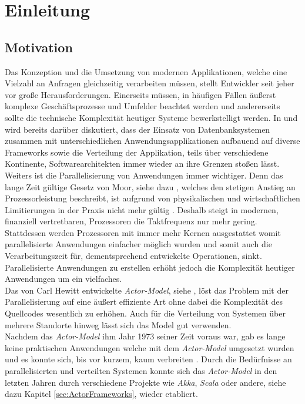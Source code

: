 \chapter{Einleitung}\label{cha:introduction}
\section{Motivation}\label{sec:introduction:motivation}
Das Konzeption und die Umsetzung von modernen Applikationen, welche eine Vielzahl an Anfragen gleichzeitig verarbeiten müssen, stellt Entwickler seit jeher vor große Herausforderungen. Einerseits müssen, in häufigen Fällen äußerst komplexe Geschäftsprozesse und Umfelder beachtet werden und andererseits sollte die technische Komplexität heutiger Systeme bewerkstelligt werden. In \cite{Vernon2015ReactiveAkka} und \cite{Evans2004Domain-drivenSoftware} wird bereits darüber diskutiert, dass der Einsatz von Datenbanksystemen zusammen mit unterschiedlichen Anwendungsapplikationen aufbauend auf diverse Frameworks  sowie die Verteilung der Applikation, teils über verschiedene Kontinente,  Softwarearchitekten immer wieder an ihre Grenzen stoßen lässt. \\
Weiters ist die Parallelisierung von Anwendungen immer wichtiger. Denn das lange Zeit gültige Gesetz von Moor, siehe dazu \cite{moore1965moore}, welches den stetigen Anstieg an Prozessorleistung beschreibt, ist aufgrund von physikalischen und wirtschaftlichen Limitierungen in der Praxis nicht mehr gültig \citep{mann2000end}. Deshalb steigt in modernen, finanziell vertretbaren, Prozessoren die Taktfrequenz nur mehr gering. Stattdessen werden Prozessoren mit immer mehr Kernen ausgestattet womit parallelisierte Anwendungen einfacher möglich wurden und somit auch die Verarbeitungszeit für, dementsprechend entwickelte Operationen, sinkt. Parallelisierte Anwendungen zu erstellen erhöht jedoch die Komplexität heutiger Anwendungen um ein vielfaches. \\
Das von Carl Hewitt entwickelte \textit{Actor-Model}, siehe \cite{Hewitt1973AIntelligence}, löst das Problem mit der Parallelisierung auf eine äußert effiziente Art ohne dabei die Komplexität des Quellcodes wesentlich zu erhöhen. Auch für die Verteilung von Systemen über mehrere Standorte hinweg lässt sich das Model gut verwenden. \\
Nachdem das \textit{Actor-Model} ihm Jahr 1973 seiner Zeit voraus war, gab es lange keine praktischen Anwendungen welche mit dem \textit{Actor-Model} umgesetzt wurden und es konnte sich, bis vor kurzem, kaum verbreiten \citep{mackay1997has}. Durch die Bedürfnisse an parallelisierten und verteilten Systemen konnte sich das \textit{Actor-Model} in den letzten Jahren durch verschiedene Projekte wie \textit{Akka}, \textit{Scala} oder andere, siehe dazu Kapitel \ref{sec:ActorFrameworks}, wieder etabliert.

